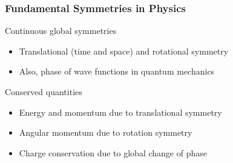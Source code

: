 \begin{frame}[t]
 \frametitle{Fundamental Symmetries in Physics}
 \begin{block}{Continuous global symmetries}
  \begin{itemize}
   \item \alert{Translational} (time and space) and \alert{rotational} symmetry
   \item<2> Also, \alert{phase of wave functions} in quantum mechanics
  \end{itemize}
 \end{block}
 \begin{block}{Conserved quantities}
  \begin{itemize}
   \item \alert{Energy and momentum} due to translational symmetry
   \item \alert{Angular momentum} due to rotation symmetry
   \item<2> \alert{Charge conservation} due to global change of phase
   \begin{center}
   \end{center}
  \end{itemize}
 \end{block}
\end{frame}
